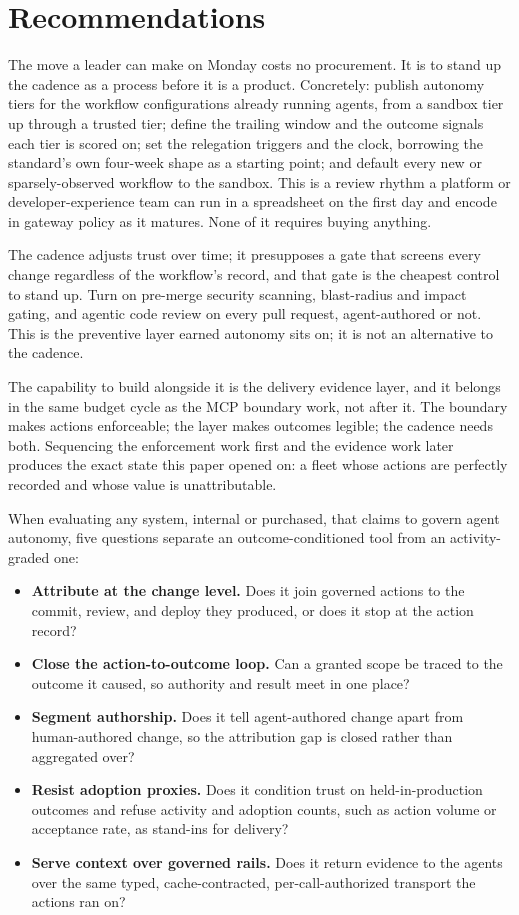 \section{Recommendations}

The move a leader can make on Monday costs no procurement. It is to stand up the
cadence as a process before it is a product. Concretely: publish autonomy tiers
for the workflow configurations already running agents, from a sandbox tier up
through a trusted tier; define the trailing window and the outcome signals each
tier is scored on; set the relegation triggers and the clock, borrowing the
standard's own four-week shape as a starting point; and default every new or
sparsely-observed workflow to the sandbox. This is a review rhythm a platform or
developer-experience team can run in a spreadsheet on the first day and encode in
gateway policy as it matures. None of it requires buying anything.

The cadence adjusts trust over time; it presupposes a gate that screens every
change regardless of the workflow's record, and that gate is the cheapest control
to stand up. Turn on pre-merge security scanning, blast-radius and impact gating,
and agentic code review on every pull request, agent-authored or not. This is the
preventive layer earned autonomy sits on; it is not an alternative to the cadence.

The capability to build alongside it is the delivery evidence layer, and it
belongs in the same budget cycle as the MCP boundary work, not after it. The
boundary makes actions enforceable; the layer makes outcomes legible; the cadence
needs both. Sequencing the enforcement work first and the evidence work later
produces the exact state this paper opened on: a fleet whose actions are
perfectly recorded and whose value is unattributable.

When evaluating any system, internal or purchased, that claims to govern agent
autonomy, five questions separate an outcome-conditioned tool from an
activity-graded one:

\begin{itemize}[leftmargin=1.4em,itemsep=0.25em,topsep=0.3em]
  \item \textbf{Attribute at the change level.} Does it join governed actions to
  the commit, review, and deploy they produced, or does it stop at the action
  record?
  \item \textbf{Close the action-to-outcome loop.} Can a granted
  scope be traced to the outcome it caused, so authority and result meet in one
  place?
  \item \textbf{Segment authorship.} Does it tell agent-authored change apart
  from human-authored change, so the attribution gap is closed rather
  than aggregated over?
  \item \textbf{Resist adoption proxies.} Does it condition trust on
  held-in-production outcomes and refuse activity and adoption counts, such as
  action volume or acceptance rate, as stand-ins for delivery?
  \item \textbf{Serve context over governed rails.} Does it return evidence to
  the agents over the same typed, cache-contracted, per-call-authorized transport
  the actions ran on?
\end{itemize}

